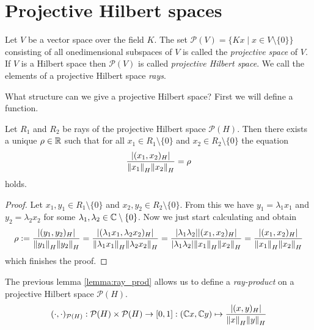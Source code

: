 \section{Projective Hilbert spaces}

\begin{definition}
	Let $V$ be a vector space over the field $K$. The set $\mathcal{P}(V) = \{Kx \mid x \in V \setminus \{0\}\}$ consisting of all onedimensional subspaces of $V$ is called the \textit{projective space} of $V$. If $V$ is a Hilbert space then $\mathcal{P}(V)$ is called \textit{projective Hilbert space}. We call the elements of a projective Hilbert space \textit{rays}.
\end{definition}

What structure can we give a projective Hilbert space? First we will define a function.

\begin{lemma} \label{lemma:ray_prod}
	Let $R_1$ and $R_2$ be rays of the projective Hilbert space $\mathcal{P}(H)$. Then there exists a unique $\rho \in \R$ such that for all $x_1 \in R_1 \setminus \{0\}$ and $x_2 \in R_2 \setminus \{0\}$ the equation
	\begin{align*}
		\frac{\vbraces{(x_1, x_2)_H}}{\norm[H]{x_1} \norm[H]{x_2}} = \rho
	\end{align*}
	holds.
\end{lemma}

\begin{proof}
	Let $x_1, y_1 \in R_1 \setminus \{0\}$ and $x_2, y_2 \in R_2 \setminus \{0\}$. From this we have $y_1 = \lambda_1 x_1$ and $y_2 = \lambda_2 x_2$ for some $\lambda_1, \lambda_2 \in \C \setminus \{0\}$. Now we just start calculating and obtain
	\begin{align*}
		\rho := \frac{\vbraces{(y_1, y_2)_H}}{\norm[H]{y_1} \norm[H]{y_2}} = \frac{\vbraces{(\lambda_1 x_1, \lambda_2 x_2)_H}}{\norm[H]{\lambda_1 x_1} \norm[H]{\lambda_2 x_2}} = \frac{\vbraces{\lambda_1 \lambda_2}\vbraces{(x_1, x_2)_H}}{\vbraces{\lambda_1 \lambda_2}\norm[H]{x_1} \norm[H]{x_2}} = \frac{\vbraces{(x_1, x_2)_H}}{\norm[H]{x_1} \norm[H]{x_2}}
	\end{align*}
	which finishes the proof.
\end{proof}

\begin{definition}
	The previous lemma \ref{lemma:ray_prod} allows us to define a \textit{ray-product} on a projective Hilbert space $\mathcal{P}(H)$.
	\begin{align*}
		(\cdot, \cdot)_{\mathcal{P}(H)}: \mathcal{P}(H) \times \mathcal{P}(H) \to [0,1] : (\C x, \C y) \mapsto \frac{\vbraces{(x, y)_H}}{\norm[H]{x} \norm[H]{y}}
	\end{align*}
\end{definition}

